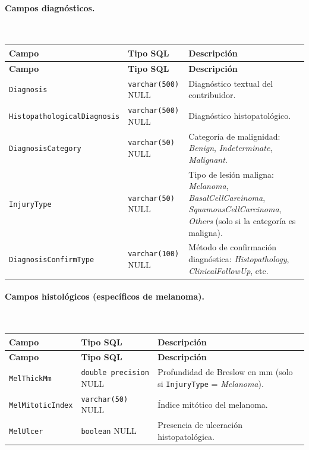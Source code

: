 \paragraph{Campos diagnósticos.}~

\begin{longtable}{|p{3.5cm}|p{4cm}|p{7cm}|}
\hline
\textbf{Campo} & \textbf{Tipo SQL} & \textbf{Descripción} \\
\hline
\endfirsthead
\hline
\textbf{Campo} & \textbf{Tipo SQL} & \textbf{Descripción} \\
\hline
\endhead
\texttt{Diagnosis} & \texttt{varchar(500)} NULL & Diagnóstico textual del contribuidor. \\
\hline
\texttt{Histopathological\-Diagnosis} & \texttt{varchar(500)} NULL & Diagnóstico histopatológico. \\
\hline
\texttt{Diagnosis\-Category} & \texttt{varchar(50)} NULL & Categoría de malignidad: \textit{Benign}, \textit{Indeterminate}, \textit{Malignant}. \\
\hline
\texttt{InjuryType} & \texttt{varchar(50)} NULL & Tipo de lesión maligna: \textit{Melanoma}, \textit{BasalCellCarcinoma}, \textit{SquamousCellCarcinoma}, \textit{Others} (solo si la categoría es maligna). \\
\hline
\texttt{Diagnosis\-ConfirmType} & \texttt{varchar(100)} NULL & Método de confirmación diagnóstica: \textit{Histopathology}, \textit{ClinicalFollowUp}, etc. \\
\hline
\end{longtable}

\paragraph{Campos histológicos (específicos de melanoma).}~

\begin{longtable}{|p{3.5cm}|p{4cm}|p{7cm}|}
\hline
\textbf{Campo} & \textbf{Tipo SQL} & \textbf{Descripción} \\
\hline
\endfirsthead
\hline
\textbf{Campo} & \textbf{Tipo SQL} & \textbf{Descripción} \\
\hline
\endhead
\texttt{MelThickMm} & \texttt{double precision} NULL & Profundidad de Breslow en mm (solo si \texttt{InjuryType} = \textit{Melanoma}). \\
\hline
\texttt{MelMitoticIndex} & \texttt{varchar(50)} NULL & Índice mitótico del melanoma. \\
\hline
\texttt{MelUlcer} & \texttt{boolean} NULL & Presencia de ulceración histopatológica. \\
\hline
\end{longtable}

